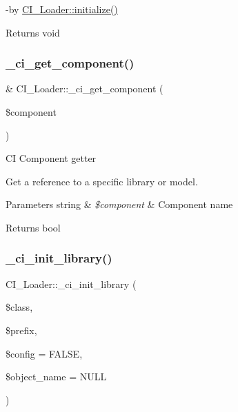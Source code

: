 -\/by \mbox{\hyperlink{class_c_i___loader_a91836c1d132ac63ef37003d6e02cf4ee}{C\+I\+\_\+\+Loader\+::initialize()}} \begin{DoxyReturn}{Returns}
void 
\end{DoxyReturn}
\mbox{\label{class_c_i___loader_a492c1af2096e19bb4d1d5af28130a729}} 
\subsubsection{\texorpdfstring{\+\_\+ci\+\_\+get\+\_\+component()}{\_ci\_get\_component()}}
{\footnotesize\ttfamily \& C\+I\+\_\+\+Loader\+::\+\_\+ci\+\_\+get\+\_\+component (\begin{DoxyParamCaption}\item[{}]{\$component }\end{DoxyParamCaption})\hspace{0.3cm}{\ttfamily [protected]}}

CI Component getter

Get a reference to a specific library or model.


\begin{DoxyParams}[1]{Parameters}
string & {\em \$component} & Component name \\
\hline
\end{DoxyParams}
\begin{DoxyReturn}{Returns}
bool 
\end{DoxyReturn}
\mbox{\label{class_c_i___loader_af4df75f7462fb73ba602a45f466a690d}} 
\subsubsection{\texorpdfstring{\+\_\+ci\+\_\+init\+\_\+library()}{\_ci\_init\_library()}}
{\footnotesize\ttfamily C\+I\+\_\+\+Loader\+::\+\_\+ci\+\_\+init\+\_\+library (\begin{DoxyParamCaption}\item[{}]{\$class,  }\item[{}]{\$prefix,  }\item[{}]{\$config = {\ttfamily FALSE},  }\item[{}]{\$object\+\_\+name = {\ttfamily NULL} }\end{DoxyParamCaption})\hspace{0.3cm}{\ttfamily [protected]}}

